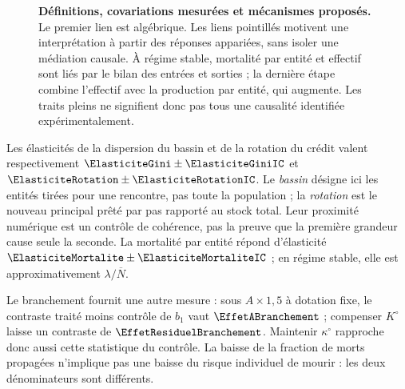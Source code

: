 \begin{figure}[htbp]\centering
{}
\caption{\textbf{Définitions, covariations mesurées et mécanismes proposés.}
Le premier lien est algébrique. Les liens pointillés motivent une
interprétation à partir des réponses appariées, sans isoler une médiation
causale. À régime stable, mortalité par entité et effectif sont liés par
le bilan des entrées et sorties ; la dernière étape combine l'effectif
avec la production par entité, qui augmente. Les traits pleins ne signifient
donc pas tous une causalité identifiée expérimentalement.}
\label{fig:chaine}
\end{figure}

Les élasticités de la dispersion du bassin et de la rotation du crédit
valent respectivement $\ElasticiteGini\pm\ElasticiteGiniIC$ et
$\ElasticiteRotation\pm\ElasticiteRotationIC$. Le \emph{bassin}
désigne ici les entités tirées pour une rencontre, pas toute la population ;
la \emph{rotation} est le nouveau principal prêté par pas rapporté au
stock total. Leur proximité numérique est un contrôle de cohérence,
pas la preuve que la première grandeur cause seule la seconde.
La mortalité par entité répond d'élasticité
$\ElasticiteMortalite\pm\ElasticiteMortaliteIC$ ; en régime stable,
elle est approximativement $\lambda/\overline N$.

Le branchement fournit une autre mesure : sous $A\times1{,}5$ à dotation
fixe, le contraste traité moins contrôle de $b_1$ vaut $\EffetABranchement$ ; compenser $K^\circ$ laisse
un contraste de $\EffetResiduelBranchement$. Maintenir
$\kappa^\circ$ rapproche donc aussi cette statistique du contrôle.
La baisse de la fraction de morts propagées n'implique pas une baisse
du risque individuel de mourir : les deux dénominateurs sont différents.

